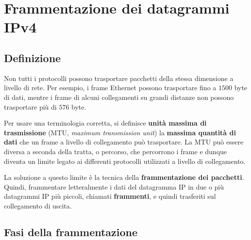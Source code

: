 \documentclass[a4paper]{article}
\begin{document}
	\section{Frammentazione dei datagrammi IPv4}
	
	\subsection{Definizione}
	
	Non tutti i protocolli possono trasportare pacchetti della stessa dimensione a livello di rete. Per esempio, i frame Ethernet possono trasportare fino a $1500$ byte di dati, mentre i frame di alcuni collegamenti su grandi distanze non possono trasportare più di $576$ byte.\newline
	
	\noindent
	Per usare una terminologia corretta, si definisce \textcolor{Red3}{\textbf{unità massima di trasmissione}} (MTU, \emph{maximum transmission unit}) la \textbf{massima quantità di dati} che un frame a livello di collegamento può trasportare. La MTU può essere diversa a seconda della tratta, o percorso, che percorrono i frame e dunque diventa un limite legato ai differenti protocolli utilizzati a livello di collegamento.\newline
	
	\noindent
	La soluzione a questo limite è la tecnica della \textcolor{Red3}{\textbf{frammentazione dei pacchetti}}. Quindi, frammentare letteralmente i dati del datagramma IP in due o più datagrammi IP più piccoli, chiamati \textbf{frammenti}, e quindi trasferiti sul collegamento di uscita.
	
	\subsection{Fasi della frammentazione}
	
\end{document}
